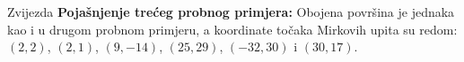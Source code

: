 \begin{statement}[
  problempoints=110,
  timelimit=1 sekunda,
  memorylimit=512 MiB,
]{Zvijezda}
\textbf{Pojašnjenje trećeg probnog primjera:}
Obojena površina je jednaka kao i u drugom probnom primjeru, a koordinate
točaka Mirkovih upita su redom: $(2, 2)$, $(2, 1)$, $(9, -14)$, $(25, 29)$,
$(-32, 30)$ i $(30, 17)$.

\end{statement}

